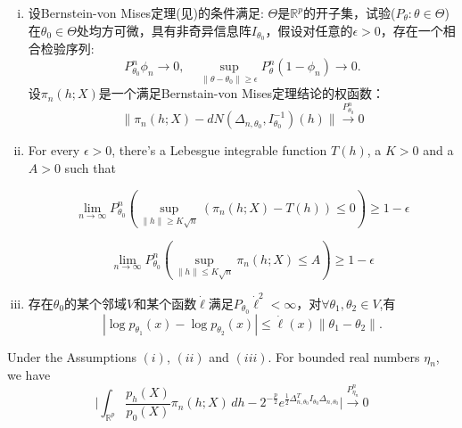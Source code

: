 
\begin{enumerate}[(i)]
    \item
        设Bernstein-von Mises定理(见\cite{van2000asymptotic})的条件满足: $\Theta$是$\mathbb{R}^p$的开子集，试验($P_{\theta}:\theta\in\Theta$)在$\theta_0\in \Theta$处均方可微，具有非奇异信息阵$I_{\theta_0}$，假设对任意的$\epsilon>0$，存在一个相合检验序列:
        \begin{equation}
            P_{\theta_0}^n\phi_n\to 0,\quad \sup_{\|\theta-\theta_0\|\geq \epsilon} P_\theta^n(1-\phi_n)\to 0.
        \end{equation}
        设$\pi_n(h;X)$是一个满足Bernstain-von Mises定理结论的权函数：
        \begin{equation}
            \|\pi_n(h;X)-dN(\Delta_{n,\theta_0},I_{\theta_0}^{-1})(h)\|\overset{P_{\theta_0}^n}{\to}0
        \end{equation}
    \item
        
        

        For every $\epsilon>0$, there's a Lebesgue integrable function $T(h)$, a $K>0$ and a $A>0$ such that 

\begin{equation}
    \lim_{n\to \infty}P_{\theta_0}^n(\sup_{\|h\|\geq K\sqrt{n}}(\pi_n(h;X)-T(h))\leq 0)\geq 1-\epsilon
\end{equation}

        \begin{equation}
            \lim_{n\to \infty} P_{\theta_0}^n(\sup_{\|h\|\leq K\sqrt{n}} \pi_n(h;X)\leq A)\geq 1-\epsilon
        \end{equation}


    \item
        存在$\theta_0$的某个邻域$V$和某个函数$\dot{\ell}$满足$P_{\theta_0}\dot{\ell}^2<\infty$，对$\forall \theta_1,\theta_2\in V$,有
        \begin{equation}
            |\log p_{\theta_1}(x)-\log p_{\theta_2}(x)|\leq \dot{\ell}(x)\|\theta_1-\theta_2\|.
        \end{equation}
\end{enumerate}


\begin{theorem}\label{theoremMain}
    Under the Assumptions $(i)$, $(ii)$ and $(iii)$. For bounded real numbers $\eta_n$, we have
    \begin{equation}
        \Big|\int_{\mathbb{R}^{p}}\frac{p_h(X)}{p_0(X)}\pi_n(h;X)\,dh-
        2^{-\frac{p}{2}}e^{\frac{1}{2}\Delta_{n,\theta_0}^TI_{\theta_0}\Delta_{n,\theta_0}}
        \Big|\xrightarrow{P_{\eta_n}^n}0
    \end{equation}
\end{theorem}


